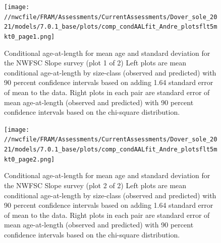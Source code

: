 \documentclass[11pt,
  english,
  a4paper,
]{article}
\begin{document}
\begin{figure}
\centering
\texttt{[image: //nwcfile/FRAM/Assessments/CurrentAssessments/Dover\_sole\_2021/models/7.0.1\_base/plots/comp\_condAALfit\_Andre\_plotsflt5mkt0\_page1.png]}
\caption{Conditional age-at-length for mean age and standard deviation for the NWFSC Slope survey (plot 1 of 2) Left plots are mean conditional age-at-length by size-class (observed and predicted) with 90 percent confidence intervals based on adding 1.64 standard error of mean to the data. Right plots in each pair are standard error of mean age-at-length (observed and predicted) with 90 percent confidence intervals based on the chi-square distribution.\label{fig:nwslope-caal-fit-1}}
\end{figure}

\tagmcend\tagstructend


\begin{figure}
\centering
\texttt{[image: //nwcfile/FRAM/Assessments/CurrentAssessments/Dover\_sole\_2021/models/7.0.1\_base/plots/comp\_condAALfit\_Andre\_plotsflt5mkt0\_page2.png]}
\caption{Conditional age-at-length for mean age and standard deviation for the NWFSC Slope survey (plot 2 of 2) Left plots are mean conditional age-at-length by size-class (observed and predicted) with 90 percent confidence intervals based on adding 1.64 standard error of mean to the data. Right plots in each pair are standard error of mean age-at-length (observed and predicted) with 90 percent confidence intervals based on the chi-square distribution.\label{fig:nwslope-caal-fit-2}}
\end{figure}

\tagmcend\tagstructend

\end{document}
